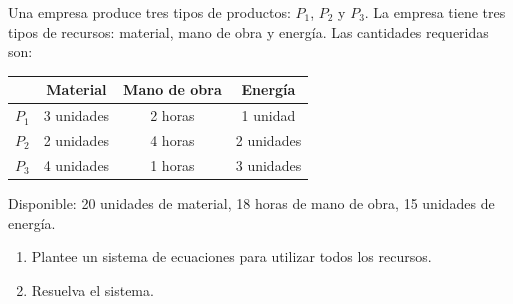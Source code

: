 \documentclass[11pt]{article}
\begin{document}
\begin{tcolorbox}[colback=blue1!10, colframe=blue1, title=Enunciado]
Una empresa produce tres tipos de productos: $P_1$, $P_2$ y $P_3$. La empresa tiene tres tipos de recursos: material, mano de obra y energía. Las cantidades requeridas son:

\begin{center}
\begin{tabular}{lccc}
\toprule
 & Material & Mano de obra & Energía \\
\midrule
$P_1$ & 3 unidades & 2 horas & 1 unidad \\
$P_2$ & 2 unidades & 4 horas & 2 unidades \\
$P_3$ & 4 unidades & 1 horas & 3 unidades \\
\bottomrule
\end{tabular}
\end{center}

Disponible: 20 unidades de material, 18 horas de mano de obra, 15 unidades de energía.

\begin{enumerate}[label=\alph*)]
    \item Plantee un sistema de ecuaciones para utilizar todos los recursos.
    \item Resuelva el sistema.
\end{enumerate}
\end{tcolorbox}
\end{document}
